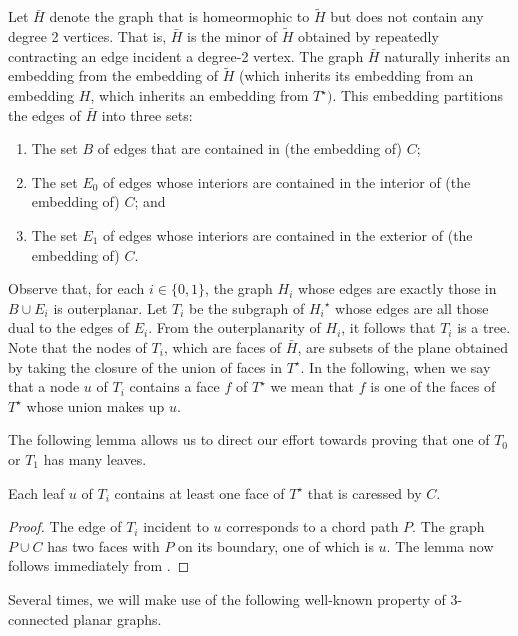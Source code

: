 \documentclass{patmorin}
\newcommand{\dual}[1]{{#1}^\star}
\begin{document}
Let $\bar{H}$ denote the graph that is homeormophic to $\tilde{H}$ but does not
contain any degree 2 vertices.  That is, $\bar{H}$ is the minor of $\tilde{H}$
obtained by repeatedly contracting an edge incident a degree-2 vertex.
The graph $\bar{H}$ naturally inherits an embedding from the embedding of $\tilde{H}$ (which inherits its embedding from an embedding $H$, which inherits an embedding from $\dual{T})$.  This embedding partitions the edges of $\bar{H}$ into three sets:
\begin{enumerate}
  \item The set $B$ of edges that are contained in (the embedding of) $C$;
  \item The set $E_0$ of edges whose interiors are contained in the interior of (the embedding of) $C$; and
  \item The set $E_1$ of edges whose interiors are contained in the exterior of (the embedding of) $C$.
\end{enumerate}

Observe that, for each $i\in\{0,1\}$, the graph $H_i$ whose edges are
exactly those in $B\cup E_i$ is outerplanar.  Let $T_i$ be the subgraph of
$\dual{H_i}$ whose edges are all those dual to the edges of $E_i$. From
the outerplanarity of $H_i$, it follows that $T_i$ is a tree. Note that
the nodes of $T_i$, which are faces of $\bar{H}$, are subsets of the
plane obtained by taking the closure of the union of faces in $\dual{T}$.
In the following, when we say that a node $u$ of $T_i$ contains a face
$f$ of $\dual{T}$ we mean that $f$ is one of the faces of $\dual{T}$
whose union makes up $u$.


The following lemma allows us to direct our effort towards proving that
one of $T_0$ or $T_1$ has many leaves.

\begin{lem}
   Each leaf $u$ of $T_i$ contains at least one face of $\dual{T}$
   that is caressed by $C$.
\end{lem}

\begin{proof}
   The edge of $T_i$ incident to $u$ corresponds to a chord path $P$. The
   graph $P\cup C$ has two faces with $P$ on its boundary, one of which
   is $u$.  The lemma now follows immediately from .
\end{proof}

Several times, we will make use of the following well-known property of
3-connected planar graphs.
\end{document}

